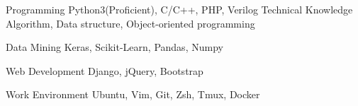 

\begin{cvskills}

  \cvskill
    {Programming} %
    {Python3(Proficient), C/C++, PHP, Verilog} %
  \cvskill
    {Technical Knowledge} %
    {Algorithm, Data structure, Object-oriented programming} %

  \cvskill
    {Data Mining} %
    {Keras, Scikit-Learn, Pandas, Numpy} %

  \cvskill
    {Web Development} %
    {Django, jQuery, Bootstrap} %

  \cvskill
    {Work Environment} %
    {Ubuntu, Vim, Git, Zsh, Tmux, Docker} %

\end{cvskills}
